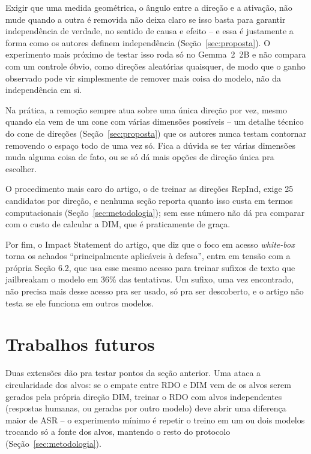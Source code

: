 \documentclass[article,11pt,oneside,a4paper,brazil,section=TITLE]{setup/abntex2}
\begin{document}
Exigir que uma medida geométrica, o ângulo entre a direção e a ativação, não mude quando a outra é removida não deixa claro se isso basta para garantir independência de verdade, no sentido de causa e efeito -- e essa é justamente a forma como os autores definem independência (Seção~\ref{sec:proposta}). O experimento mais próximo de testar isso roda só no Gemma~2~2B e não compara com um controle óbvio, como direções aleatórias quaisquer, de modo que o ganho observado pode vir simplesmente de remover mais coisa do modelo, não da independência em si.

Na prática, a remoção sempre atua sobre uma única direção por vez, mesmo quando ela vem de um cone com várias dimensões possíveis -- um detalhe técnico do cone de direções (Seção~\ref{sec:proposta}) que os autores nunca testam contornar removendo o espaço todo de uma vez só. Fica a dúvida se ter várias dimensões muda alguma coisa de fato, ou se só dá mais opções de direção única pra escolher.

O procedimento mais caro do artigo, o de treinar as direções RepInd, exige 25 candidatos por direção, e nenhuma seção reporta quanto isso custa em termos computacionais (Seção~\ref{sec:metodologia}); sem esse número não dá pra comparar com o custo de calcular a DIM, que é praticamente de graça.

Por fim, o Impact Statement do artigo, que diz que o foco em acesso \emph{white-box} torna os achados ``principalmente aplicáveis à defesa'', entra em tensão com a própria Seção 6.2, que usa esse mesmo acesso para treinar sufixos de texto que jailbreakam o modelo em 36\% das tentativas. Um sufixo, uma vez encontrado, não precisa mais desse acesso pra ser usado, só pra ser descoberto, e o artigo não testa se ele funciona em outros modelos.

\section{Trabalhos futuros}

Duas extensões dão pra testar pontos da seção anterior. Uma ataca a circularidade dos alvos: se o empate entre RDO e DIM vem de os alvos serem gerados pela própria direção DIM, treinar o RDO com alvos independentes (respostas humanas, ou geradas por outro modelo) deve abrir uma diferença maior de ASR -- o experimento mínimo é repetir o treino em um ou dois modelos trocando só a fonte dos alvos, mantendo o resto do protocolo (Seção~\ref{sec:metodologia}).
\end{document}
